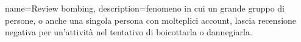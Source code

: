 {
	name={Review bombing},
	description={fenomeno in cui un grande gruppo di persone, o anche una singola persona con molteplici account, lascia recensione negativa per un'attività nel tentativo di boicottarla o dannegiarla.}
}